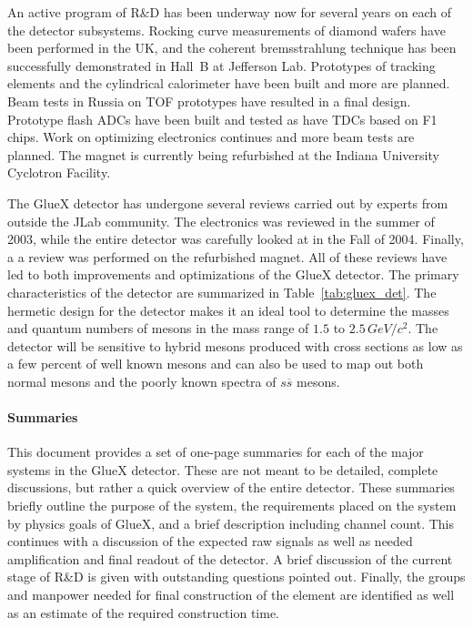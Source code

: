 \hspace{1cm}
An active program of R\&D has been underway now for several years on each of the 
detector subsystems. Rocking curve measurements of diamond wafers have 
been performed  in the UK, and the coherent bremsstrahlung technique has been 
successfully demonstrated in Hall~B at Jefferson Lab. Prototypes of tracking 
elements and the cylindrical calorimeter have been built and more are planned.  
Beam tests in Russia on TOF prototypes have resulted in a final design.  
Prototype flash ADCs have been built and tested as have TDCs based on F1 chips.  
Work on optimizing electronics continues and more beam tests are planned.  
The magnet is currently being refurbished at the Indiana University Cyclotron 
Facility. 

\hspace{1cm}
The GlueX detector has undergone several reviews carried out by experts from
outside the JLab community. The electronics was reviewed in the summer of
2003, while the entire detector was carefully looked at in the Fall of 2004.
Finally, a a review was performed on the refurbished magnet. All of these
reviews have led to both improvements and optimizations of the GlueX
detector. The primary characteristics of the detector are summarized in 
Table~\ref{tab:gluex_det}.  The hermetic design for the detector makes it 
an ideal tool to determine the masses and quantum numbers of mesons in the 
mass range of $1.5$ to $2.5\, GeV/c^{2}$. The detector will be sensitive 
to hybrid mesons produced with cross sections as low as a few percent
of well known mesons and can also be used to map out both normal mesons and
the poorly known spectra of $s\overline{s}$ mesons.

\hspace{1cm}
\paragraph{Summaries} This document provides a set of one-page summaries for each of the 
major systems in the GlueX detector. These are not meant to be
detailed, complete discussions, but rather a quick overview of the
entire detector. These summaries briefly outline the 
purpose of the system, the requirements placed on the system by
physics goals of GlueX, and a brief description including channel 
count. This continues with  a discussion of the expected raw signals 
as well as needed amplification and final readout of the detector.
A brief discussion of the current stage of R\&D is given with 
outstanding questions pointed out. Finally, the groups and manpower
needed for final construction of the element are identified as 
well as an estimate of the required construction time. 


